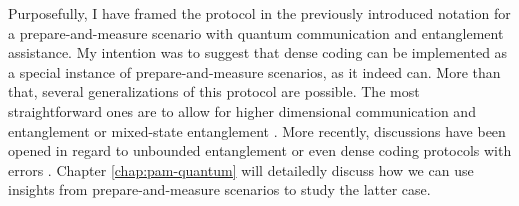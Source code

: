             Purposefully, I have framed the protocol in the previously introduced notation for a prepare-and-measure scenario with quantum communication and entanglement assistance. My intention was to suggest that dense coding can be implemented as a special instance of prepare-and-measure scenarios, as it indeed can. More than that, several generalizations of this protocol are possible. The most straightforward ones are to allow for higher dimensional communication and entanglement \cite{bennett_1992_superdense} or mixed-state entanglement \cite{barenco_dense_1995}. More recently, discussions have been opened in regard to unbounded entanglement \cite{tavakoli_eapam_2021} or even dense coding protocols with errors \cite{nayak_rigidity_2020,moreno_pamdense_2021}. Chapter \ref{chap:pam-quantum} will detailedly discuss how we can use insights from prepare-and-measure scenarios to study the latter case. 